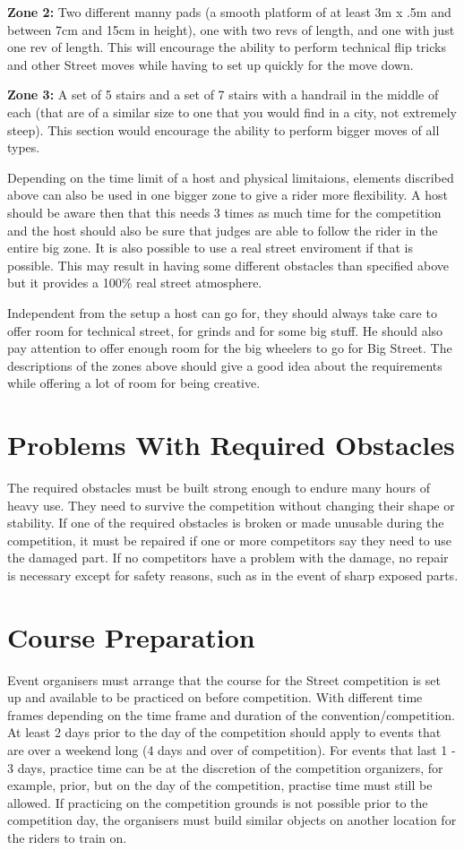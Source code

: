 \textbf{Zone 2:}
Two different manny pads (a smooth platform of at least 3m x .5m and between 7cm and 15cm in height), one with two revs of length, and one with just one rev of length.
This will encourage the ability to perform technical flip tricks and other Street moves while having to set up quickly for the move down.

\textbf{Zone 3:}
A set of 5 stairs and a set of 7 stairs with a handrail in the middle of each (that are of a similar size to one that you would find in a city, not extremely steep).
This section would encourage the ability to perform bigger moves of all types.

Depending on the time limit of a host and physical limitaions, elements discribed above can also be used in one bigger zone to give a rider more flexibility.
A host should be aware then that this needs 3 times as much time for the competition and the host should also be sure that judges are able to follow the rider in the entire big zone.
It is also possible to use a real street enviroment if that is possible.
This may result in having some different obstacles than specified above but it provides a 100\% real street atmosphere. 

Independent from the setup a host can go for, they should always take care to offer room for technical street, for grinds and for some big stuff.
He should also pay attention to offer enough room for the big wheelers to go for Big Street. 
The descriptions of the zones above should give a good idea about the requirements while offering a lot of room for being creative.

\section{Problems With Required Obstacles}
The required obstacles must be built strong enough to endure many hours of heavy use.
They need to survive the competition without changing their shape or stability.
If one of the required obstacles is broken or made unusable during the competition, it must be repaired if one or more competitors say they need to use the damaged part.
If no competitors have a problem with the damage, no repair is necessary except for safety reasons, such as in the event of sharp exposed parts. 

\section{Course Preparation}
Event organisers must arrange that the course for the Street competition is set up and available to be practiced on before competition.
With different time frames depending on the time frame and duration of the convention/competition.
At least 2 days prior to the day of the competition should apply to events that are over a weekend long (4 days and over of competition).
For events that last 1 - 3 days, practice time can be at the discretion of the competition organizers, for example, prior, but on the day of the competition, practise time must still be allowed.
If practicing on the competition grounds is not possible prior to the competition day, the organisers must build similar objects on another location for the riders to train on.

